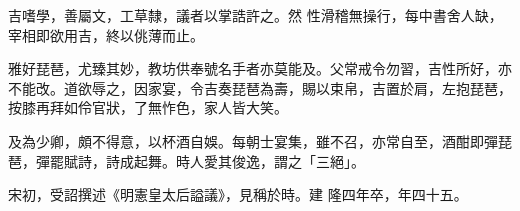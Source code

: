 \begin{pinyinscope}
 吉嗜學，善屬文，工草隸，議者以掌誥許之。然
 性滑稽無操行，每中書舍人缺，宰相即欲用吉，終以佻薄而止。



 雅好琵琶，尤臻其妙，教坊供奉號名手者亦莫能及。父常戒令勿習，吉性所好，亦不能改。道欲辱之，因家宴，令吉奏琵琶為壽，賜以束帛，吉置於肩，左抱琵琶，按膝再拜如伶官狀，了無怍色，家人皆大笑。



 及為少卿，頗不得意，以杯酒自娛。每朝士宴集，雖不召，亦常自至，酒酣即彈琵琶，彈罷賦詩，詩成起舞。時人愛其俊逸，謂之「三絕」。



 宋初，受詔撰述《明憲皇太后謚議》，見稱於時。建
 隆四年卒，年四十五。



\end{pinyinscope}